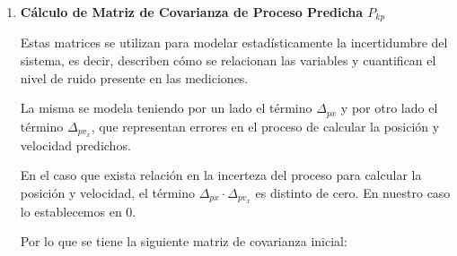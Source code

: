 \begin{enumerate}
Entonces la ecuación para obtener el nuevo estado predicho es:

\begin{equation}
    X_{kp} = 
    \begin{bmatrix}
    1 & \Delta t  \\
    0 & 1         \\
    \end{bmatrix} \\
    \cdot \begin{bmatrix} x_{k-1} \\ v_{k-1} \\ \end{bmatrix}
    +
    \begin{bmatrix}
    \frac{1}{2} \Delta t^2 \\
    \Delta t               \\
    \end{bmatrix}          \\
    \cdot
    \begin{bmatrix} 0 \\ \end{bmatrix} \\
    +
    \begin{bmatrix} 0 \\ 0 \\ \end{bmatrix}
\end{equation}

\item \textbf{Cálculo de Matriz de Covarianza de Proceso Predicha $P_{kp}$} \mbox{} \vspace{4pt}

Estas matrices se utilizan para modelar estadísticamente la incertidumbre del sistema, es decir, describen cómo se relacionan las variables y cuantifican el nivel de ruido presente en las mediciones. \cite{tzafestas2013introduction} \cite{Rigatos01062007}

La misma se modela teniendo por un lado el término $\Delta_{px}$ y por otro lado el término $\Delta_{pv_x}$, que representan errores en el proceso de calcular la posición y velocidad predichos.

En el caso que exista relación en la incerteza del proceso para calcular la posición y velocidad, el término $\Delta_{px} \cdot \Delta_{pv_x}$ es distinto de cero. En nuestro caso lo establecemos en $0$.

Por lo que se tiene la siguiente matriz de covarianza inicial:


\end{enumerate}
